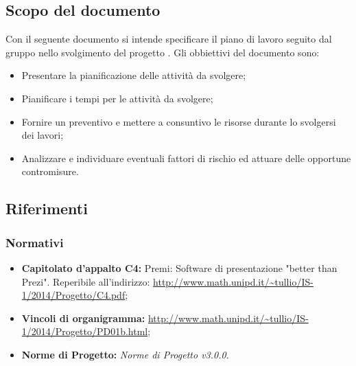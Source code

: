 \subsection{Scopo del documento}
Con il seguente documento si intende specificare il piano di lavoro seguito dal gruppo \GRUPPO{} nello svolgimento del progetto \PROGETTO{}.
Gli obbiettivi del documento sono:
\begin{itemize}
	\item Presentare la pianificazione delle attività da svolgere;
	\item Pianificare i tempi per le attività da svolgere;
	\item Fornire un preventivo e mettere a consuntivo le risorse durante lo svolgersi dei lavori;
	\item Analizzare e individuare eventuali fattori di rischio ed attuare delle opportune contromisure.
\end{itemize}

\subsection{Riferimenti}
\subsubsection{Normativi}
\begin{itemize}
	\item \textbf{Capitolato d'appalto C4:} Premi: Software di presentazione "better than Prezi". Reperibile all'indirizzo: \url{http://www.math.unipd.it/~tullio/IS-1/2014/Progetto/C4.pdf};
	\item \textbf{Vincoli di organigramma:} \url{http://www.math.unipd.it/~tullio/IS-1/2014/Progetto/PD01b.html}; 
	\item \textbf{Norme di Progetto:} \textit{Norme di Progetto v3.0.0}.
\end{itemize}

